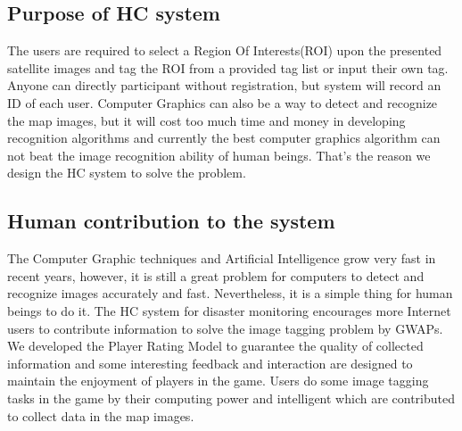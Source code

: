  \subsection{Purpose of HC system}
  The users are required to select a Region Of Interests(ROI) upon the presented satellite images 
  and tag the ROI from a provided tag list or input their own tag. Anyone can directly participant 
  without registration, but system will record an ID of each user.
  Computer Graphics can also be a way to detect and recognize the map images, but it will cost 
  too much time and money in developing recognition algorithms and currently the best 
  computer graphics algorithm can not beat the image recognition ability of human beings. 
  That's the reason we design the HC system to solve the problem.

  \subsection{Human contribution to the system}
  The Computer Graphic techniques and Artificial Intelligence grow very fast in recent years, 
  however, it is still a great problem for computers to detect and recognize images accurately and fast.
  Nevertheless, it is a simple thing for human beings to do it.
  The HC system for disaster monitoring encourages more Internet users to contribute information 
  to solve the image tagging problem by GWAPs. 
  We developed the Player Rating Model to guarantee the quality of collected information 
  and some interesting feedback and interaction are designed to maintain the enjoyment of players in the game.
  Users do some image tagging tasks in the game by their computing power and intelligent 
  which are contributed to collect data in the map images.

